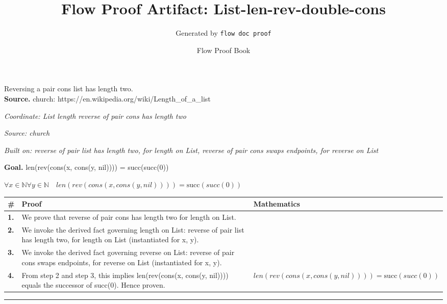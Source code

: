 \documentclass[11pt]{article}
\title{Flow Proof Artifact: List-len-rev-double-cons}
\author{Generated by \texttt{flow doc proof}}
\date{Flow Proof Book}
\theoremstyle{definition}
\begin{document}
\maketitle
Reversing a pair cons list has length two.\\[0.5em]
\textbf{Source.} church: https://en.wikipedia.org/wiki/Length\_of\_a\_list\\[0.5em]
\bigskip
{}\par
\smallskip\noindent\textit{Coordinate: List \cdot length \cdot reverse of pair cons has length two}\par
\smallskip\noindent\textit{Source: church}\par
\smallskip\noindent\textit{Built on: reverse of pair list has length two, for length on List, reverse of pair cons swaps endpoints, for reverse on List}\par
\medskip
\noindent\textbf{Goal.} len(rev(cons(x, cons(y, nil)))) = succ(succ(0))\par
\noindent$\displaystyle \forall x \in \mathbb{N} \forall y \in \mathbb{N}\quad len(rev(cons(x, cons(y, nil)))) = \mathrm{succ}(succ(0))$\par
\medskip
\noindent
\begin{tabular}{@{} >{\raggedright\arraybackslash}p{} >{\raggedright\arraybackslash}p{} >{\raggedleft\arraybackslash}p{} @{}}
\textbf{\#} & \textbf{Proof} & \textbf{Mathematics} \\
\midrule
\textbf{1.} & We prove that reverse of pair cons has length two for length on List. & \\[0.45em]
\textbf{2.} & We invoke the derived fact governing length on List: reverse of pair list has length two, for length on List (instantiated for x, y). & \\[0.45em]
\textbf{3.} & We invoke the derived fact governing reverse on List: reverse of pair cons swaps endpoints, for reverse on List (instantiated for x, y). & \\[0.45em]
\textbf{4.} & From step 2 and step 3, this implies len(rev(cons(x, cons(y, nil)))) equals the successor of succ(0). Hence proven. & $\displaystyle len(rev(cons(x, cons(y, nil)))) = \mathrm{succ}(succ(0))$ \\[0.45em]
\bottomrule
\end{tabular}
\label{thm:List-length-reverse_of_pair_cons_has_length_two}
\par\medskip\hrule
\end{document}
